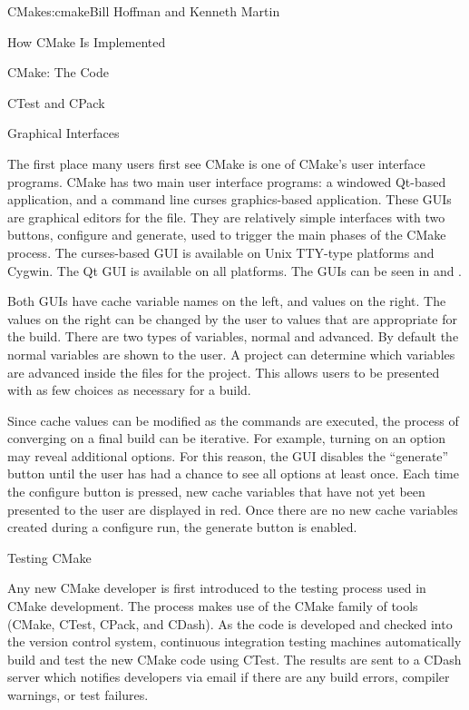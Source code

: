 \begin{aosachapter}{CMake}{s:cmake}{Bill Hoffman and Kenneth Martin}
\begin{aosasect1}{How CMake Is Implemented}
\begin{aosasect2}{CMake: The Code}
\begin{aosasect3}{CTest and CPack}
\end{aosasect3}

\end{aosasect2}

\begin{aosasect2}{Graphical Interfaces}

The first place many users first see CMake is one of CMake's user
interface programs. CMake has two main user interface programs:
a windowed Qt-based application, and a command line
curses graphics-based application. These GUIs are
graphical editors for the  file. They are
relatively simple interfaces with two buttons, configure and
generate, used to trigger the main phases of the CMake process. The
curses-based GUI is available on Unix TTY-type platforms and
Cygwin. The Qt GUI is available on all platforms.  The GUIs can be
seen in  and .



Both GUIs have cache variable names on the left, and values on the
right. The values on the right can be changed by the user to values
that are appropriate for the build. There are two types of
variables, normal and advanced. By default the normal variables are
shown to the user. A project can determine which variables are
advanced inside the  files for the project. This
allows users to be presented with as few choices as necessary for a
build.

Since cache values can be modified as the commands are executed, the
process of converging on a final build can be iterative. For example,
turning on an option may reveal additional options. For this reason,
the GUI disables the ``generate'' button until the user has had a
chance to see all options at least once. Each time the configure
button is pressed, new cache variables that have not yet been
presented to the user are displayed in red. Once there are
no new cache variables created during a configure run, the generate
button is enabled.

\end{aosasect2}

\begin{aosasect2}{Testing CMake}

Any new CMake developer is first introduced to the testing process
used in CMake development. The process makes use of the CMake family
of tools (CMake, CTest, CPack, and CDash).  As the code is developed
and checked into the version control system, continuous integration
testing machines automatically build and test the new CMake code using
CTest. The results are sent to a CDash server which notifies
developers via email if there are any build errors, compiler warnings,
or test failures.


\end{aosasect2}
\end{aosasect1}
\end{aosachapter}
